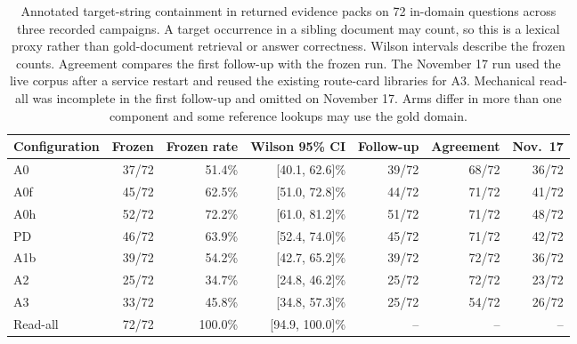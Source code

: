 \begin{table}[t]
\centering\small
\caption{Annotated target-string containment in returned evidence packs on 72
in-domain questions across three recorded campaigns. A target
occurrence in a sibling document may count, so this is a lexical proxy rather
than gold-document retrieval or answer correctness. Wilson intervals describe
the frozen counts. Agreement compares the first follow-up with the frozen
run. The November 17 run used the live corpus after a service restart and
reused the existing route-card libraries for A3. Mechanical read-all was
incomplete in the first follow-up and omitted on November 17. Arms
differ in more than one component and some reference lookups may use the gold
domain.}
\label{tab:s-arm-data}
\begin{tabular}{lrrrrrr}
\toprule
Configuration & Frozen & Frozen rate & Wilson 95\% CI & Follow-up & Agreement & Nov.\ 17 \\
\midrule
A0 & 37/72 & 51.4\% & [40.1, 62.6]\% & 39/72 & 68/72 & 36/72 \\
A0f & 45/72 & 62.5\% & [51.0, 72.8]\% & 44/72 & 71/72 & 41/72 \\
A0h & 52/72 & 72.2\% & [61.0, 81.2]\% & 51/72 & 71/72 & 48/72 \\
PD & 46/72 & 63.9\% & [52.4, 74.0]\% & 45/72 & 71/72 & 42/72 \\
A1b & 39/72 & 54.2\% & [42.7, 65.2]\% & 39/72 & 72/72 & 36/72 \\
A2 & 25/72 & 34.7\% & [24.8, 46.2]\% & 25/72 & 72/72 & 23/72 \\
A3 & 33/72 & 45.8\% & [34.8, 57.3]\% & 25/72 & 54/72 & 26/72 \\
Read-all & 72/72 & 100.0\% & [94.9, 100.0]\% & -- & -- & -- \\
\bottomrule
\end{tabular}
\end{table}
